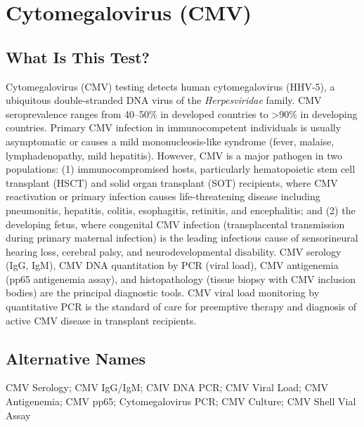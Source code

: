 \chapter{Cytomegalovirus (CMV)}

\section*{What Is This Test?}
Cytomegalovirus (CMV) testing detects human cytomegalovirus (HHV-5), a ubiquitous double-stranded DNA virus of the \textit{Herpesviridae} family. CMV seroprevalence ranges from 40--50\% in developed countries to >90\% in developing countries. Primary CMV infection in immunocompetent individuals is usually asymptomatic or causes a mild mononucleosis-like syndrome (fever, malaise, lymphadenopathy, mild hepatitis). However, CMV is a major pathogen in two populations: (1) immunocompromised hosts, particularly hematopoietic stem cell transplant (HSCT) and solid organ transplant (SOT) recipients, where CMV reactivation or primary infection causes life-threatening disease including pneumonitis, hepatitis, colitis, esophagitis, retinitis, and encephalitis; and (2) the developing fetus, where congenital CMV infection (transplacental transmission during primary maternal infection) is the leading infectious cause of sensorineural hearing loss, cerebral palsy, and neurodevelopmental disability. CMV serology (IgG, IgM), CMV DNA quantitation by PCR (viral load), CMV antigenemia (pp65 antigenemia assay), and histopathology (tissue biopsy with CMV inclusion bodies) are the principal diagnostic tools. CMV viral load monitoring by quantitative PCR is the standard of care for preemptive therapy and diagnosis of active CMV disease in transplant recipients.

\section*{Alternative Names}
CMV Serology; CMV IgG/IgM; CMV DNA PCR; CMV Viral Load; CMV Antigenemia; CMV pp65; Cytomegalovirus PCR; CMV Culture; CMV Shell Vial Assay

